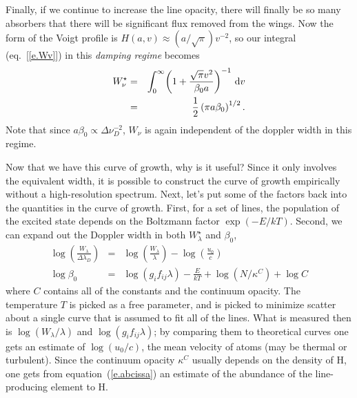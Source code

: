 Finally, if we continue to increase the line opacity, there will finally be so many absorbers that there will be significant flux removed from the wings.  Now the form of the Voigt profile is $H(a,v)\approx (a/\sqrt{\pi}) v^{-2}$, so our integral (eq.~[\ref{e.Wv}]) in this \emph{damping regime} becomes
\begin{eqnarray}\label{e.damping}
W_{\nu}^{\star} &=& \int_{0}^{\infty}\! \left(1+\frac{\sqrt{\pi}v^{2}}{\beta_{0}a}\right)^{-1}\, \mathrm{d} v\nonumber\\
 &=& \frac{1}{2}\left(\pi a \beta_{0}\right)^{1/2}.
\end{eqnarray}
Note that since $a\beta_{0}\propto \Delta\nu_{D}^{-2}$, $W_{\nu}$ is again independent of the doppler width in this regime.

Now that we have this curve of growth, why is it useful? Since it only involves the equivalent width, it is possible to construct the curve of growth empirically without a high-resolution spectrum. Next, let's put some of the factors back into the quantities in the curve of growth.  First, for a set of lines, the population of the excited state depends on the Boltzmann factor $\exp(-E/kT)$. Second, we can expand out the Doppler width in both $W_{\lambda}^{\star}$ and $\beta_{0}$,
\begin{eqnarray}
\log\left(\frac{W_{\lambda}}{\Delta\lambda_{D}}\right) &=& \log\left(\frac{W_{\lambda}}{\lambda}\right) - \log\left(\frac{u_{0}}{c}\right)\label{e.ordinate}\\
\log\beta_{0} &=& \log(g_{i}f_{ij}\lambda) - \frac{E}{kT} +\log(N/\kappa^{C}) + \log C\label{e.abcissa}
\end{eqnarray}
where $C$ contains all of the constants and the continuum opacity.  The temperature $T$ is picked as a free parameter, and is picked to minimize scatter about a single curve that is assumed to fit all of the lines.  What is measured then is $\log(W_{\lambda}/\lambda)$ and $\log(g_{i}f_{ij}\lambda)$; by comparing them to theoretical curves one gets an estimate of $\log(u_{0}/c)$, the mean velocity of atoms (may be thermal or turbulent).  Since the continuum opacity $\kappa^{C}$ usually depends on the density of H, one gets from equation~(\ref{e.abcissa}) an estimate of the abundance of the line-producing element to H.

